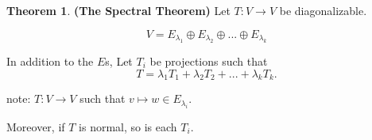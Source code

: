 \documentclass[a5paper]{article}
\theoremstyle{definition}%
\newtheorem{theorem}{Theorem}
\numberwithin{theorem}{section} %
\begin{document}
\begin{theorem}
\textbf{(The Spectral Theorem)}
Let $T:V \to V$ be diagonalizable.

$$V = E_{\lambda_1} \oplus E_{\lambda_2} \oplus ... \oplus E_{\lambda_k}$$

In addition to the $E$s, Let $T_i$ be projections such that 
$$ T = \lambda_1T_1 + \lambda_2T_2 + ... + \lambda_kT_k.$$

note: $T:V \to V$ such that $v \mapsto w \in E_{\lambda_i}$.

Moreover, if $T$ is normal, so is each $T_i$.

\end{theorem}
\end{document}
